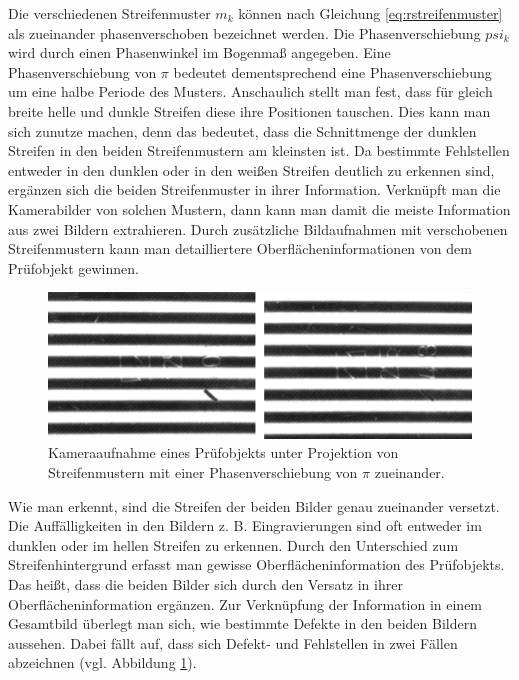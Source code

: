 \noindent
Die verschiedenen Streifenmuster $m_k$ können nach Gleichung \ref{eq:rstreifenmuster} als zueinander phasenverschoben bezeichnet werden.
Die Phasenverschiebung $psi_k$ wird durch einen Phasenwinkel im Bogenmaß angegeben.
Eine Phasenverschiebung von $ \pi $ bedeutet dementsprechend eine Phasenverschiebung um eine halbe Periode des Musters.
Anschaulich stellt man fest, dass für gleich breite helle und dunkle Streifen diese ihre Positionen tauschen.
Dies kann man sich zunutze machen, denn das bedeutet, dass die Schnittmenge der dunklen Streifen in den beiden Streifenmustern am kleinsten ist.
Da bestimmte Fehlstellen entweder in den dunklen oder in den weißen Streifen deutlich zu erkennen sind, ergänzen sich die beiden Streifenmuster in ihrer Information.
Verknüpft man die Kamerabilder von solchen Mustern, dann kann man damit die meiste Information aus zwei Bildern extrahieren.
Durch zusätzliche Bildaufnahmen mit verschobenen Streifenmustern kann man detailliertere Oberflächeninformationen von dem Prüfobjekt gewinnen.

\begin{figure}[H]
	\centering
	\includegraphics[width=\textwidth]{03_sichtpruefungDurchLichtstreuung/einsatzVonMehrerenStreifenmustern/figures/imageToLink}
	\caption[Zu verknüpfende Bilder]{Kameraaufnahme eines Prüfobjekts unter Projektion von Streifenmustern mit einer Phasenverschiebung von $ \pi $ zueinander.}
	\label{img:imageToLink}
\end{figure}

\noindent
Wie man erkennt, sind die Streifen der beiden Bilder genau zueinander versetzt.
Die Auffälligkeiten in den Bildern z. B. Eingravierungen sind oft entweder im dunklen oder im hellen Streifen zu erkennen.
Durch den Unterschied zum Streifenhintergrund erfasst man gewisse Oberflächeninformation des Prüfobjekts.
Das heißt, dass die beiden Bilder sich durch den Versatz in ihrer Oberflächeninformation ergänzen.
Zur Verknüpfung der Information in einem Gesamtbild überlegt man sich, wie bestimmte Defekte in den beiden Bildern aussehen.
Dabei fällt auf, dass sich Defekt- und Fehlstellen in zwei Fällen abzeichnen (vgl. Abbildung \ref{img:imageToLink}).

